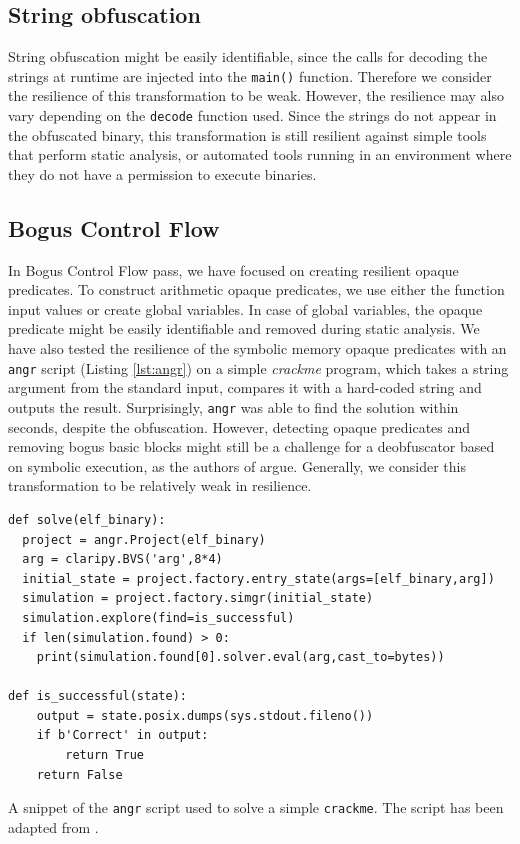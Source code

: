 \documentclass[
  digital, %
  notable,   %
  twoside, %
  nolof,     %
  nolot,     %
]{fithesis3}
\theoremstyle{definition}
\begin{document}
\subsection{String obfuscation}
String obfuscation might be easily identifiable, since the calls for decoding the strings at runtime are injected into the \texttt{main()} function. Therefore we consider the resilience of this transformation to be weak. However, the resilience may also vary depending on the \texttt{decode} function used. Since the strings do not appear in the obfuscated binary, this transformation is still resilient against simple tools that perform static analysis, or automated tools running in an environment where they do not have a permission to execute binaries. 

\subsection{Bogus Control Flow}

In Bogus Control Flow pass, we have focused on creating resilient opaque predicates. To construct arithmetic opaque predicates, we use either the function input values or create global variables. In case of global variables, the opaque predicate might be easily identifiable and removed during static analysis. We have also tested the resilience of the symbolic memory opaque predicates with an \texttt{angr} script (Listing \ref{lst:angr}) on a simple \textit{crackme} program, which takes a string argument from the standard input, compares it with a hard-coded string and outputs the result. Surprisingly, \texttt{angr} was able to find the solution within seconds, despite the obfuscation. However, detecting opaque predicates and removing bogus basic blocks might still be a challenge for a deobfuscator based on symbolic execution, as the authors of \cite{bi_opaque} argue. Generally, we consider this transformation to be relatively weak in resilience. 

\begin{listing}[!ht]
\begin{verbatim}
def solve(elf_binary):
  project = angr.Project(elf_binary) 
  arg = claripy.BVS('arg',8*4)
  initial_state = project.factory.entry_state(args=[elf_binary,arg]) 
  simulation = project.factory.simgr(initial_state) 
  simulation.explore(find=is_successful)
  if len(simulation.found) > 0:
    print(simulation.found[0].solver.eval(arg,cast_to=bytes))

def is_successful(state):
	output = state.posix.dumps(sys.stdout.fileno())
	if b'Correct' in output: 
		return True
	return False
\end{verbatim}
\label{lst:angr}
\caption{A snippet of the \texttt{angr} script used to solve a simple \texttt{crackme}. The script has been adapted from \cite{crackme_angr}.}
\end{listing}
\end{document}
